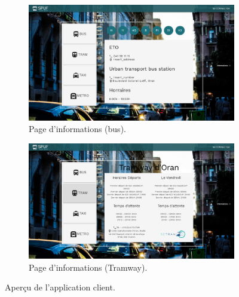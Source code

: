 \begin{figure}
	 \begin{subfigure}[b]{\linewidth}
	 	\includegraphics[width=\linewidth]{img/spuf/infobus.png}
	 	\caption{Page d'informations (bus).}
	 \end{subfigure}
	 
	 \begin{subfigure}[b]{\linewidth}
	 	\includegraphics[width=\linewidth]{img/spuf/infotram.png}
	 	\caption{Page d'informations (Tramway).}	 
	 \end{subfigure}
	 \caption{Aperçu de l'application client.}
	 \label{fig:clientInterface3}
\end{figure}

